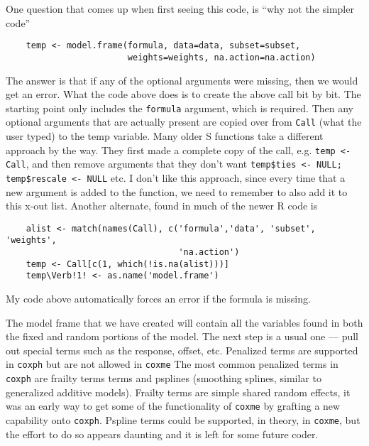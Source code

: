 \documentclass{article}
\begin{document}
One question that comes up when first seeing this code, is ``why not the
simpler code''
\begin{verbatim}
    temp <- model.frame(formula, data=data, subset=subset, 
                        weights=weights, na.action=na.action)
\end{verbatim}
The answer is that if any of the optional arguments were missing, then we would
get an error.  
What the code above does is to create the above call bit by bit. 
The starting point only includes the \Verb!formula! argument, which is
required.
Then any optional arguments that are actually present are copied over
from \Verb!Call! (what the user typed) to the temp variable.
Many older S functions take a different approach by the way.  They first made
a complete copy of the call, e.g. \Verb!temp <- Call!, and then 
remove arguments that they don't want
\Verb!temp$ties <- NULL; temp$rescale <- NULL! etc.
I don't like this approach, since every time that a new argument
is added to the function, we need to remember to also add
it to this x-out list.  
Another alternate, found in much of the newer R code is
\begin{verbatim}
    alist <- match(names(Call), c('formula','data', 'subset', 'weights',
                                  'na.action')
    temp <- Call[c(1, which(!is.na(alist)))]
    temp\Verb!1! <- as.name('model.frame')
\end{verbatim}
My code above automatically forces an error if the formula is missing.

The model frame that we have created will contain all the variables found
in both the fixed and random portions of the model.
The next step is a usual one --- pull out special terms such as the response,
offset, etc.
Penalized terms are supported in \Verb!coxph! but are not allowed in \Verb?coxme?
The most common penalized terms in \Verb!coxph! are frailty terms
terms and psplines
(smoothing splines, similar to generalized additive models).
Frailty terms are simple shared random effects, 
it was an early way to get some of
the functionality of \Verb!coxme! by grafting a new capability onto \Verb?coxph?.
Pspline terms could be supported, in theory, in \Verb!coxme!, but the
effort to do so appears daunting and it is left for some future coder.
\end{document}

